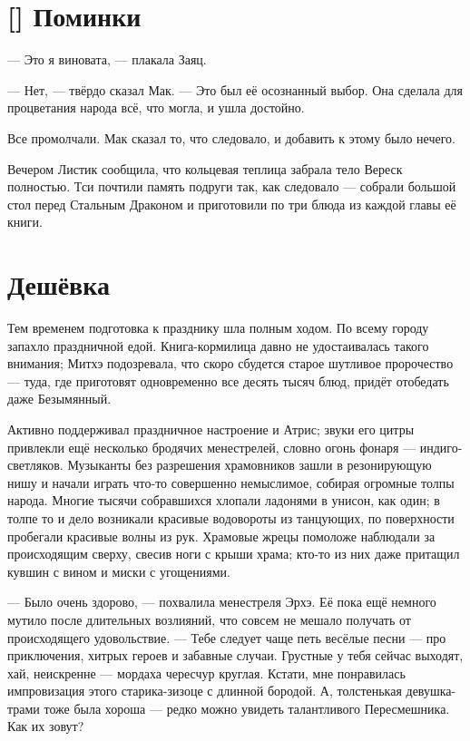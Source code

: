 \section{[] Поминки}

\textspace

--- Это я виновата, --- плакала Заяц.

--- Нет, --- твёрдо сказал Мак.
--- Это был её осознанный выбор.
Она сделала для процветания народа всё, что могла, и ушла достойно.

Все промолчали.
Мак сказал то, что следовало, и добавить к этому было нечего.

Вечером Листик сообщила, что кольцевая теплица забрала тело Вереск полностью.
Тси почтили память подруги так, как следовало --- собрали большой стол перед Стальным Драконом и приготовили по три блюда из каждой главы её книги.

\section{Дешёвка}

Тем временем подготовка к празднику шла полным ходом.
По всему городу запахло праздничной едой.
Книга-кормилица давно не удостаивалась такого внимания;
Митхэ подозревала, что скоро сбудется старое шутливое пророчество --- туда, где приготовят одновременно все десять тысяч блюд, придёт отобедать даже Безымянный.

Активно поддерживал праздничное настроение и Атрис;
звуки его цитры привлекли ещё несколько бродячих менестрелей, словно огонь фонаря --- индиго-светляков.
Музыканты без разрешения храмовников зашли в резонирующую нишу и начали играть что-то совершенно немыслимое, собирая огромные толпы народа.
Многие тысячи собравшихся хлопали ладонями в унисон, как один;
в толпе то и дело возникали красивые водовороты из танцующих, по поверхности пробегали красивые волны из рук.
Храмовые жрецы помоложе наблюдали за происходящим сверху, свесив ноги с крыши храма;
кто-то из них даже притащил кувшин с вином и миски с угощениями.

--- Было очень здорово, --- похвалила менестреля Эрхэ.
Её пока ещё немного мутило после длительных возлияний, что совсем не мешало получать от происходящего удовольствие.
--- Тебе следует чаще петь весёлые песни --- про приключения, хитрых героев и забавные случаи.
Грустные у тебя сейчас выходят, хай, неискренне --- мордаха чересчур круглая.
Кстати, мне понравилась импровизация этого старика-зизоце с длинной бородой.
А, толстенькая девушка-трами тоже была хороша --- редко можно увидеть талантливого Пересмешника.
Как их зовут?

